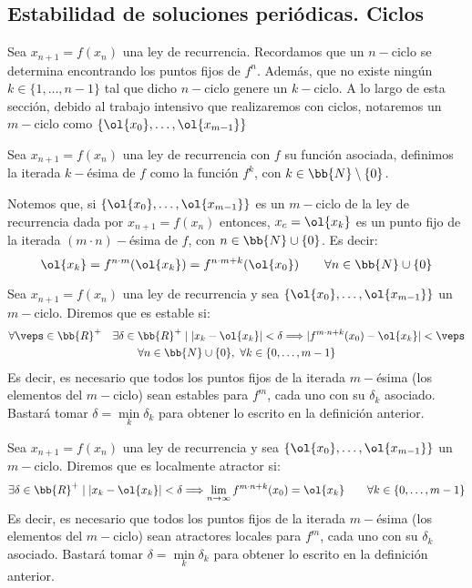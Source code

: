 \subsection{Estabilidad de soluciones periódicas. Ciclos}

Sea $x_{n+1} = f(x_n)$ una ley de recurrencia. Recordamos que un $n-$ciclo se determina encontrando los puntos fijos de $f^n$. Además, que no existe ningún $k \in \{1, \ldots, n-1\}$ tal que dicho $n-$ciclo genere un $k-$ciclo. A lo largo de esta sección, debido al trabajo intensivo que realizaremos con ciclos, notaremos un $m-$ciclo como $\{\ol{x_0}, \ldots, \ol{x_{m-1}}\}$

\begin{definicion}
    Sea $x_{n+1} = f(x_n)$ una ley de recurrencia con $f$ su función asociada, definimos la iterada $k-$ésima de $f$ como la función $f^k$, con $k \in \bb{N}\setminus \{0\}$.
\end{definicion}
Notemos que, si $\{\ol{x_0}, \ldots, \ol{x_{m-1}}\}$ es un $m-$ciclo de la ley de recurrencia dada por $x_{n+1} = f(x_n)$ entonces, $x_c = \ol{x_k}$ es un punto fijo de la iterada $(m\cdot n)-$ésima de $f$, con $n\in \bb{N}\cup \{0\}$. Es decir:
$$\ol{x_k} = f^{n\cdot m} (\ol{x_k}) = f^{n\cdot m+k} (\ol{x_0}) \qquad \forall n\in \bb{N}\cup \{0\}$$

\begin{definicion}
    Sea $x_{n+1} = f(x_n)$ una ley de recurrencia y sea $\{\ol{x_0}, \ldots, \ol{x_{m-1}}\}$ un $m-$ciclo. Diremos que es estable si:
    \begin{multline*}
        \forall \veps\in \bb{R}^+\quad \exists \delta \in \bb{R}^+ \mid |x_k-\ol{x_k}| < \delta \Longrightarrow |f^{m\cdot n+k}(x_0)-\ol{x_k}|<\veps \\ \forall n\in \bb{N}\cup\{0\},~\forall k\in \{0,\dots,m-1\}
    \end{multline*}
    Es decir, es necesario que todos los puntos fijos de la iterada $m-$ésima (los elementos del $m-$ciclo) sean estables para $f^m$, cada uno con su $\delta_k$ asociado. Bastará tomar $\delta=\min\limits_{k}\delta_k$ para obtener lo escrito en la definición anterior.
\end{definicion}

\begin{definicion}
    Sea $x_{n+1} = f(x_n)$ una ley de recurrencia y sea $\{\ol{x_0}, \ldots, \ol{x_{m-1}}\}$ un $m-$ciclo. Diremos que es localmente atractor si:
    \begin{equation*}
        \exists \delta \in \bb{R}^+ \mid |x_k-\ol{x_k}| < \delta \Longrightarrow \lim_{n\to \infty} f^{m\cdot n+k}(x_0) = \ol{x_k} \qquad \forall k\in \{0,\dots,m-1\}
    \end{equation*}
    Es decir, es necesario que todos los puntos fijos de la iterada $m-$ésima (los elementos del $m-$ciclo) sean atractores locales para $f^m$, cada uno con su $\delta_k$ asociado. Bastará tomar $\delta=\min\limits_{k}\delta_k$ para obtener lo escrito en la definición anterior.
\end{definicion}

